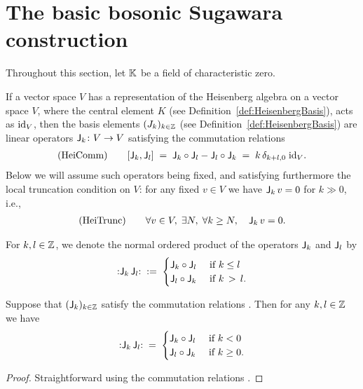 \section{The basic bosonic Sugawara construction}%
\label{sec:sugawara}

Throughout this section, let $\mathbb{K}$ be a field of characteristic zero.


If a vector space $V$ has a representation %
of the Heisenberg algebra on a vector space $V$,
where the central element $K$ (see Definition~\ref{def:HeisenbergBasis}),
acts as $\mathrm{id}_V$, then the basis elements $(J_k)_{k \in \mathbb{Z}}$
(see Definition~\ref{def:HeisenbergBasis}) are linear operators $\mathsf{J}_k \colon V \to V$
satisfying the commutation relations
\begin{align*}%
  \mathrm{\tagHeiComm} \qquad
  [\Joper_k, \Joper_l]
  \; = \; \Joper_k \circ \Joper_l - \Joper_l \circ \Joper_k
  \; = \; k \, \delta_{k+l,0} \; \id_V .
\end{align*}
Below we will assume such operators being fixed, and satisfying furthermore the
local truncation condition on $V$: for any fixed $v \in V$ we have
$\mathsf{J}_k \, v = 0$ for $k \gg 0$, i.e.,
\begin{align*}%
  \mathrm{\tagHeiTrunc} \qquad
  \forall v \in V , \; \exists N, \; \forall k \ge N, \quad
  \Joper_k \, v = 0 .
\end{align*}

\begin{definition}
  \label{def:NormalOrdering}
  \leanok
  For $k,l \in \mathbb{Z}$, we denote the normal ordered product of the operators $\mathsf{J}_k$
  and $\mathsf{J}_l$ by
  \begin{align*}
    {\mathbb{:} \mathsf{J}_k \, \mathsf{J}_l \mathbb{:}} \; := \;
    \begin{cases}
      \mathsf{J}_k \circ \mathsf{J}_l & \text{ if } k \le l \\
      \mathsf{J}_l \circ \mathsf{J}_k & \text{ if } k \, > \, l .
    \end{cases}
  \end{align*}
\end{definition}

\begin{lemma}
  \label{lem:AlternativeNormalOrdering}
  \leanok
  Suppose that $(\mathsf{J}_{k})_{k \in \mathbb{Z}}$ satisfy the commutation relations
  \tagHeiComm{}. Then for any $k,l \in \mathbb{Z}$ we have
  \begin{align*}
    {\mathbb{:} \mathsf{J}_k \, \mathsf{J}_l \mathbb{:}} \; = \;
    \begin{cases}
      \mathsf{J}_k \circ \mathsf{J}_l & \text{ if } k < 0 \\
      \mathsf{J}_l \circ \mathsf{J}_k & \text{ if } k \ge 0 .
    \end{cases}
  \end{align*}
\end{lemma}
\begin{proof}
  \leanok
  Straightforward using the commutation relations \tagHeiComm{}.
\end{proof}

